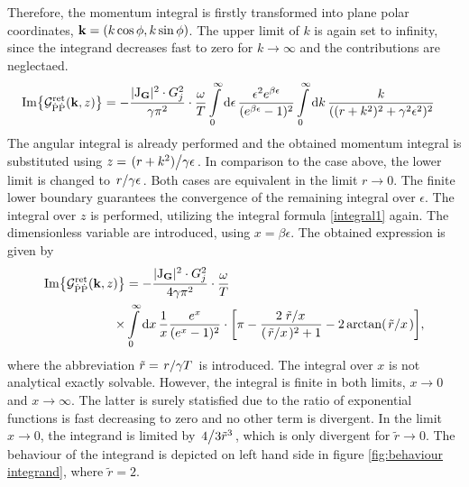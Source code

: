 Therefore, the momentum integral is firstly transformed into plane polar coordinates, $\vb{k} = (k\cos\phi, k\sin\phi)$.
The upper limit of $k$ is again set to infinity, since the integrand decreases fast to zero for $k \to \infty$ and the contributions are neglectaed.
%
\begin{align}
	\Im{\mathcal{G}_{\dot{\mathrm{P}}\dot{\mathrm{P}}}^{\mathrm{ret}}(\vb{k}, z)} &= 
		-\frac{\vert \mathrm{J}_{\vb{G}} \vert^{2} \cdot G_{j}^{2}}{\gamma \pi^{2}} \cdot 
		\frac{\omega}{T}
		\int\limits_{0}^{\infty} \dd{\epsilon}
		\frac{\epsilon^{2} e^{\beta \epsilon}}{(e^{\beta \epsilon} - 1)^{2}}
		\int\limits_{0}^{\infty} \dd{k}
		\frac{k}{((r + k^{2})^{2} + \gamma^{2} \epsilon^{2})^{2}}
	\label{eq:starting expression}
\end{align}
%
The angular integral is already performed and the obtained momentum integral is substituted using $z = \flatfrac{(r + k^{2})}{\gamma\epsilon}$.
In comparison to the case above, the lower limit is changed to $\flatfrac{r}{\gamma \epsilon}$.
Both cases are equivalent in the limit $r \to 0$.
The finite lower boundary guarantees the convergence of the remaining integral over $\epsilon$.
The integral over $z$ is performed, utilizing the integral formula \eqref{integral1} again.
The dimensionless variable are introduced, using $x = \beta \epsilon$.
The obtained expression is given by
%
\begin{align}
	\Im{\mathcal{G}_{\dot{\mt{P}}\dot{\mt{P}}}^{\mt{ret}}(\vb{k}, z)} &= 
		-\frac{\vert \mt{J}_{\vb{G}} \vert^{2} \cdot G_{j}^{2}}{4 \gamma \pi^{2}} \cdot 
		\frac{\omega}{T}
		\notag \\
		\times &\int\limits_{0}^{\infty} \dd{x}
		\frac{1}{x} \frac{e^{x}}{(e^{x} - 1)^{2}} \cdot
		\bigg[\pi - \frac{2 \flatfrac{\tilde{r}}{x}}{(\flatfrac{\tilde{r}}{x})^2 + 1} - 2 \arctan(\flatfrac{\tilde{r}}{x})\bigg],
	\label{eq:figure behaviour integrand}
\end{align}
%
where the abbreviation $\tilde{r} = \flatfrac{r}{\gamma T}$ is introduced.
The integral over $x$ is not analytical exactly solvable.
However, the integral is finite in both limits, $x \to 0$ and $x \to \infty$.
The latter is surely statisfied due to the ratio of exponential functions is fast decreasing to zero and no other term is divergent.
In the limit $x \to 0$, the integrand is limited by $\flatfrac{4}{3\tilde{r}^{3}}$, which is only divergent for $\tilde{r} \to 0$.
The behaviour of the integrand is depicted on left hand side in figure \ref{fig:behaviour integrand}, where $\tilde{r} = 2$.
%
